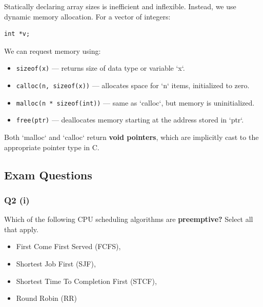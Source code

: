 \documentclass[a4paper, 10pt]{article}
\begin{document}
Statically declaring array sizes is inefficient and inflexible. Instead, we use dynamic memory allocation. For a vector of integers:

\begin{verbatim}
int *v;
\end{verbatim}

We can request memory using:

\begin{itemize}
    \item \texttt{sizeof(x)} — returns size of data type or variable `x`.
    \item \texttt{calloc(n, sizeof(x))} — allocates space for `n` items, initialized to zero.
    \item \texttt{malloc(n * sizeof(int))} — same as `calloc`, but memory is uninitialized.
    \item \texttt{free(ptr)} — deallocates memory starting at the address stored in `ptr`.
\end{itemize}

Both `malloc` and `calloc` return \textbf{void pointers}, which are implicitly cast to the appropriate pointer type in C.

\subsection{Exam Questions}
\subsubsection*{Q2 (i)}
Which of the following CPU scheduling algorithms are \textbf{preemptive?} Select all that apply.
\begin{itemize}
    \item First Come First Served (FCFS),
    \item Shortest Job First (SJF),
    \item Shortest Time To Completion First (STCF),
    \item Round Robin (RR)
\end{itemize}
\end{document}
